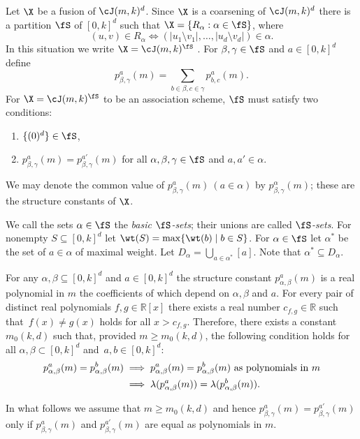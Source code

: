 Let $\X$ be a fusion of $\cJ(m, k)^d$.
Since $\X$ is a coarsening of $\cJ(m, k)^d$ there is a partition $\fS$ of $[0,k]^d$ such that $\X = \{R_\alpha : \alpha \in \fS\}$, where
\[
    (u, v) \in R_\alpha \iff (|u_1 \setminus v_1|, \dots, |u_d \setminus v_d|) \in \alpha.
\]
In this situation we write $\X = \cJ(m, k)^\fS$ \cite[Section~4]{E}.
For $\beta, \gamma \in \fS$ and $a \in [0,k]^d$ define
\[
    p^a_{\beta,\gamma}(m) = \sum_{b\in \beta, c \in \gamma} p^a_{b,c}(m).
\]
For $\X = \cJ(m,k)^\fS$ to be an association scheme, $\fS$ must satisfy two conditions:
\begin{enumerate}
    \item $\{(0)^d\} \in \fS$,
    \item $p^a_{\beta,\gamma}(m) = p^{a'}_{\beta,\gamma}(m)$ for all $\alpha,\beta,\gamma \in \fS$ and $a,a' \in \alpha$.
\end{enumerate}
We may denote the common value of $p^a_{\beta,\gamma}(m) ~ (a\in\alpha)$ by $p^\alpha_{\beta,\gamma}(m)$; these are the structure constants of $\X$.


We call the sets $\alpha \in \fS$ the \emph{basic $\fS$-sets};
their unions are called \emph{$\fS$-sets}.
For nonempty $S \subseteq [0,k]^d$ let $\wt(S) = \max\{\wt(b) \mid b \in S\}$.
For $\alpha \in \fS$ let $\alpha^*$ be the set of $a \in \alpha$ of maximal weight.
Let $D_\alpha = \bigcup_{a \in \alpha^*} [a]$. Note that $\alpha^*\subseteq D_\alpha$.


{For any $\alpha,\beta\subseteq [0,k]^d$ and $a\in [0,k]^d$ the structure constant $p_{\alpha,\beta}^a(m)$ is a real polynomial in $m$ the coefficients of which depend on $\alpha,\beta$ and $a$. For every pair of distinct real polynomials $f,g\in \mathbb{R}[x]$ there exists a real number $c_{f,g}\in\mathbb{R}$ such that~$f(x)\neq g(x)$ holds for all $x > c_{f,g}$. Therefore, there exists a constant $m_0(k,d)$ such that, provided $m \geq m_0(k, d)$, the following condition holds for all $\alpha,\beta\subset [0,k]^d$ and~$a,b\in [0,k]^d$:
\begin{align}\label{poly}
    p_{\alpha,\beta}^a(m) = p_{\alpha,\beta}^b(m)
    &\implies p_{\alpha,\beta}^a(m) = p_{\alpha,\beta}^b(m)\text{ as polynomials in } m \\
    \notag &\implies \lambda(p_{\alpha,\beta}^a(m)) = \lambda(p_{\alpha,\beta}^b(m)).
\end{align}}

{In what follows we assume that $m \geq m_0(k, d)$ and hence $p^a_{\beta,\gamma}(m) = p^{a'}_{\beta,\gamma}(m)$ only if $p^a_{\beta,\gamma}(m)$ and $p^{a'}_{\beta,\gamma}(m)$ are equal as polynomials in $m$.}
